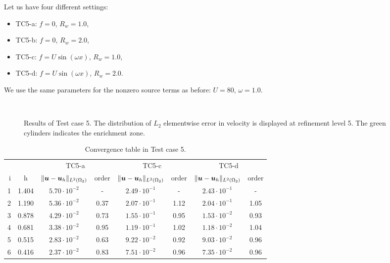 Let us have four different settings: 
\begin{itemize}
    \item TC5-a: $f=0$, $R_w=1.0$,
    \item TC5-b: $f=0$, $R_w=2.0$,
    \item TC5-c: $f=U\sin(\omega x)$, $R_w=1.0$,
    \item TC5-d: $f=U\sin(\omega x)$, $R_w=2.0$.
\end{itemize}
We use the same parameters for the nonzero source terms as before: $U=80$, $\omega=1.0$.
%
\begin{figure}[!htb]
    \centering
     \\
    \caption[Error distribution in Test case 5.]
    {Results of Test case 5. The distribution of $L_2$ elementwise error in velocity is displayed at refinement level 5.
    The green cylinders indicates the enrichment zone. }
    \label{fig:mh_tc5_error}
\end{figure}
%
\begin{table}[!htb]
\begin{center}
\bgroup
\def\arraystretch{1.2}
\setlength\tabcolsep{5pt}
\begin{tabular}{rc|cc|cc|cc}
\toprule
\multicolumn{2}{c|}{} & \multicolumn{2}{c|}{ TC5-a } & \multicolumn{2}{c|}{ TC5-c } & \multicolumn{2}{c}{TC5-d}\\ [3pt] %
i & h & $\|\mathbf{\boldsymbol{u}}-\mathbf{\boldsymbol{u}}_h\|_{L^2(\Omega_2)}$ & order & $\|\mathbf{\boldsymbol{u}}-\mathbf{\boldsymbol{u}}_h\|_{L^2(\Omega_2)}$
    & order & $\|\mathbf{\boldsymbol{u}}-\mathbf{\boldsymbol{u}}_h\|_{L^2(\Omega_2)}$ & order \\ [3pt] \midrule
1 & 1.404 & $5.70\cdot10^{-2}$  &  -   & $2.49\cdot10^{-1}$  &  -   & $2.43\cdot10^{-1}$ &   -   \\
2 & 1.190 & $5.36\cdot10^{-2}$  & 0.37 & $2.07\cdot10^{-1}$  & 1.12 & $2.04\cdot10^{-1}$ &  1.05 \\
3 & 0.878 & $4.29\cdot10^{-2}$  & 0.73 & $1.55\cdot10^{-1}$  & 0.95 & $1.53\cdot10^{-2}$ &  0.93 \\
4 & 0.681 & $3.38\cdot10^{-2}$  & 0.95 & $1.19\cdot10^{-1}$  & 1.02 & $1.18\cdot10^{-2}$ &  1.04 \\
5 & 0.515 & $2.83\cdot10^{-2}$  & 0.63 & $9.22\cdot10^{-2}$  & 0.92 & $9.03\cdot10^{-2}$ &  0.96 \\
6 & 0.416 & $2.37\cdot10^{-2}$  & 0.83 & $7.51\cdot10^{-2}$  & 0.96 & $7.35\cdot10^{-2}$ &  0.96 \\
\bottomrule
\end{tabular}
\caption{Convergence table in Test case 5.}
\label{tab:mh_tc5_convergence}
\egroup
\end{center}
\end{table}

